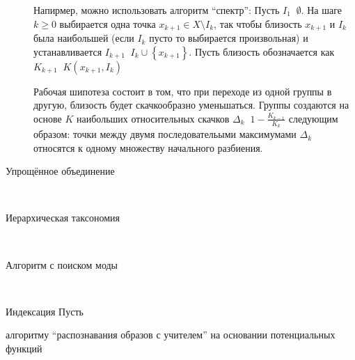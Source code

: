 \documentclass[a4paper]{article}
\newcommand{\obj}[1]{{\left\{ #1 \right \}}}
\newcommand{\defn}{\mathop{\overset{\Delta}{=}}\nolimits}
\begin{document}
\begin{description}
Напирмер, можно использовать алгоритм ``спектр'':
Пусть $I_1 \defn \emptyset$. На шаге $k\geq0$ выбирается одна точка $x_{k+1}\in X\setminus I_k$,
так чтобы близость $x_{k+1}$ и $I_k$ была наибольшей (если $I_k$ пусто то выбирается произвольная)
и устанавливается $I_{k+1} \defn I_k \cup \obj{x_{k+1}}$.
Пусть близость обозначается как $K_{k+1} \defn K(x_{k+1},I_k)$

Рабочая шипотеза состоит в том, что при переходе из одной группы в другую, близость будет скачкообразно уменьшаться.
Группы создаются на основе $K$ наибольших относительных скачков $\Delta_k \defn 1-\frac{K_{k-1}}{K_k}$
следующим образом: точки между двумя последовательыми максимумами $\Delta_k$ относятся к одному множеству начального разбиения.

\item[Упрощённое объединение] \hfill \\
\item[Иерархическая таксономия] \hfill \\
\item[Алгоритм с поиском моды] \hfill \\

\end{description}
Индексация
Пусть 

алгоритму ``распознавания образов с учителем'' на основании потенциальных функций




\end{document}
